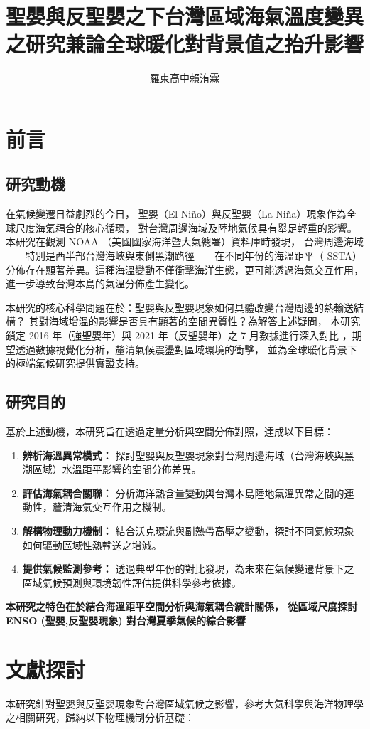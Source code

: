 \documentclass[UTF8, fontset=none,12pt]{ctexart}
\title{\fontsize{25}{30}\selectfont 聖嬰與反聖嬰之下台灣區域海氣溫度變異之研究兼論全球暖化對背景值之抬升影響}
\author{\fontsize{16}{14}\selectfont 羅東高中\hspace{4cm}賴洧霖}
\begin{document}
\pagestyle{plain}%
\date{}
\maketitle
\section{前言}
\subsection{研究動機}
在氣候變遷日益劇烈的今日，
聖嬰（El Niño）與反聖嬰（La Niña）現象作為全球尺度海氣耦合的核心循環，
對台灣周邊海域及陸地氣候具有舉足輕重的影響。本研究在觀測 NOAA
（美國國家海洋暨大氣總署）資料庫時發現，
台灣周邊海域——特別是西半部台灣海峽與東側黑潮路徑——在不同年份的海溫距平（
SSTA）分佈存在顯著差異。這種海溫變動不僅衝擊海洋生態，更可能透過海氣交互作用，
進一步導致台灣本島的氣溫分佈產生變化。

本研究的核心科學問題在於：聖嬰與反聖嬰現象如何具體改變台灣周邊的熱輸送結構？
其對海域增溫的影響是否具有顯著的空間異質性？為解答上述疑問，
本研究鎖定 2016 年（強聖嬰年）與 2021 年（反聖嬰年）之 7 月數據進行深入對比
，期望透過數據視覺化分析，釐清氣候震盪對區域環境的衝擊，
並為全球暖化背景下的極端氣候研究提供實證支持。
\subsection{研究目的}
基於上述動機，本研究旨在透過定量分析與空間分佈對照，達成以下目標：
\begin{enumerate}
    \item \textbf{辨析海溫異常模式：} 探討聖嬰與反聖嬰現象對台灣周邊海域（台灣海峽與黑潮區域）水溫距平影響的空間分佈差異。
    \item \textbf{評估海氣耦合關聯：} 分析海洋熱含量變動與台灣本島陸地氣溫異常之間的連動性，釐清海氣交互作用之機制。
    \item \textbf{解構物理動力機制：} 結合沃克環流與副熱帶高壓之變動，探討不同氣候現象如何驅動區域性熱輸送之增減。
    \item \textbf{提供氣候監測參考：} 透過典型年份的對比發現，為未來在氣候變遷背景下之區域氣候預測與環境韌性評估提供科學參考依據。
\end{enumerate}

{\bfseries \selectfont
本研究之特色在於結合海溫距平空間分析與海氣耦合統計關係，
從區域尺度探討 ENSO (聖嬰,反聖嬰現象) 對台灣夏季氣候的綜合影響}
\section{文獻探討}
本研究針對聖嬰與反聖嬰現象對台灣區域氣候之影響，參考大氣科學與海洋物理學之相關研究，歸納以下物理機制分析基礎：
\end{document}
